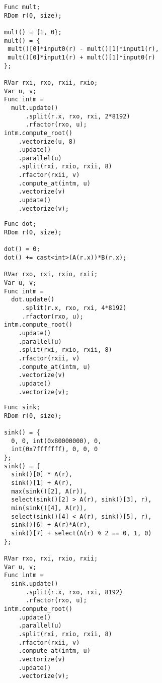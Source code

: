 \begin{minipage}{\linewidth}
\begin{lstlisting}[caption={Complex product}, label={lst:benchmark_complex_multiply}]
Func mult;
RDom r(0, size);

mult() = {1, 0};
mult() = {
 mult()[0]*input0(r) - mult()[1]*input1(r),
 mult()[0]*input1(r) + mult()[1]*input0(r)
};

RVar rxi, rxo, rxii, rxio;
Var u, v;
Func intm =
  mult.update()
      .split(r.x, rxo, rxi, 2*8192)
      .rfactor(rxo, u);
intm.compute_root()
    .vectorize(u, 8)
    .update()
    .parallel(u)
    .split(rxi, rxio, rxii, 8)
    .rfactor(rxii, v)
    .compute_at(intm, u)
    .vectorize(v)
    .update()
    .vectorize(v);
\end{lstlisting}
\end{minipage}

\begin{minipage}{\linewidth}
\begin{lstlisting}[caption={Dot product}, label={lst:benchmark_dot_product}]
Func dot;
RDom r(0, size);

dot() = 0;
dot() += cast<int>(A(r.x))*B(r.x);

RVar rxo, rxi, rxio, rxii;
Var u, v;
Func intm =
  dot.update()
     .split(r.x, rxo, rxi, 4*8192)
     .rfactor(rxo, u);
intm.compute_root()
    .update()
    .parallel(u)
    .split(rxi, rxio, rxii, 8)
    .rfactor(rxii, v)
    .compute_at(intm, u)
    .vectorize(v)
    .update()
    .vectorize(v);
\end{lstlisting}
\end{minipage}

\begin{minipage}{\linewidth}
\begin{lstlisting}[caption={Everything but the kitchen sink.}, label={lst:benchmark_kitchen_sink}]
Func sink;
RDom r(0, size);

sink() = {
  0, 0, int(0x80000000), 0,
  int(0x7fffffff), 0, 0, 0
};
sink() = {
  sink()[0] * A(r),
  sink()[1] + A(r),
  max(sink()[2], A(r)),
  select(sink()[2] > A(r), sink()[3], r),
  min(sink()[4], A(r)),
  select(sink()[4] < A(r), sink()[5], r),
  sink()[6] + A(r)*A(r),
  sink()[7] + select(A(r) % 2 == 0, 1, 0)
};

RVar rxo, rxi, rxio, rxii;
Var u, v;
Func intm =
  sink.update()
      .split(r.x, rxo, rxi, 8192)
      .rfactor(rxo, u);
intm.compute_root()
    .update()
    .parallel(u)
    .split(rxi, rxio, rxii, 8)
    .rfactor(rxii, v)
    .compute_at(intm, u)
    .vectorize(v)
    .update()
    .vectorize(v);
\end{lstlisting}
\end{minipage}
